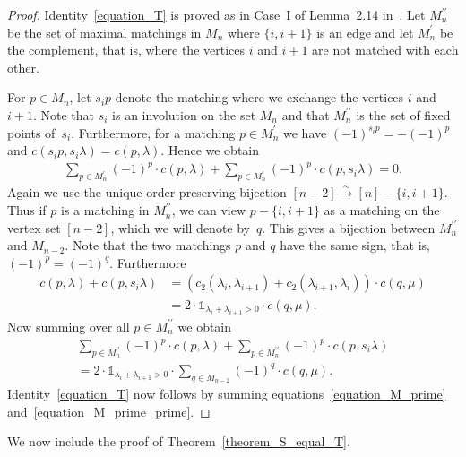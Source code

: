 \documentclass[ALCO,ThmDefs,Unicode,epreuves]{cedram}
\newcommand{\fl}{\rightarrow}
\newcommand{\ungras}{\mathds{1}}
\newcommand{\iso}{\stackrel{\sim}{\fl}}
\begin{document}
\begin{proof}
Identity~\eqref{equation_T} 
is proved as in Case~I of Lemma~2.14 in~\cite{Herb}.
Let $M_{n}^{\prime\prime}$ be the set
of maximal matchings in $M_{n}$ where
$\{i,i+1\}$ is an edge and
let $M_{n}^{\prime}$ be the complement,
that is, where the vertices $i$ and $i+1$ are not matched with each other.

For $p \in M_{n}$, let $s_{i}p$ denote the
matching where we exchange the vertices $i$ and~$i+1$.
Note that $s_{i}$ is an involution on the
set $M_{n}$
and that $M_{n}^{\prime\prime}$ is the set of fixed points
of~$s_{i}$.
Furthermore, for a matching $p \in M_{n}^{\prime}$
we have
$(-1)^{s_{i} p} = - (-1)^{p}$
and
$c(s_{i}p, s_{i} \lambda) = c(p, \lambda)$.
Hence we obtain
\begin{align}
\sum_{p \in M_{n}^{\prime}} (-1)^{p} \cdot c(p, \lambda)
+
\sum_{p \in M_{n}^{\prime}} (-1)^{p} \cdot c(p, s_{i} \lambda)
= 0 .
\label{equation_M_prime}
\end{align}
Again we use
the unique order-preserving bijection $[n-2] \iso [n] - \{i,i+1\}$.
Thus if $p$ is a matching in $M_{n}^{\prime\prime}$, we can view
$p-\{i,i+1\}$ as a matching
on the vertex set $[n-2]$, which we will denote by~$q$.
This gives a bijection between
$M_{n}^{\prime\prime}$
and $M_{n-2}$.
Note that the two matchings $p$ and $q$ have the same sign,
that is, $(-1)^{p} = (-1)^{q}$.
Furthermore
\begin{align*}
c(p,\lambda) + c(p,s_{i}\lambda) 
& =
(c_{2}(\lambda_{i},\lambda_{i+1}) + c_{2}(\lambda_{i+1},\lambda_{i}))
\cdot
c(q,\mu) \\
& =
2 \cdot \ungras_{\lambda_{i}+\lambda_{i+1} > 0}
\cdot
c(q,\mu) .
\end{align*}
Now summing over all $p \in M_{n}^{\prime\prime}$
we obtain
\begin{multline}
\label{equation_M_prime_prime}
\sum_{p \in M_{n}^{\prime\prime}}
(-1)^{p} \cdot c(p, \lambda)
+
\sum_{p \in M_{n}^{\prime\prime}}
(-1)^{p} \cdot c(p, s_{i} \lambda)
\\ = 
2 \cdot \ungras_{\lambda_{i}+\lambda_{i+1} > 0} 
\cdot
\sum_{q \in M_{n-2}} (-1)^{q} \cdot c(q, \mu) .
\end{multline}
Identity~\eqref{equation_T} 
now follows by summing equations~\eqref{equation_M_prime}
and~\eqref{equation_M_prime_prime}.
\end{proof}


We now include the proof of Theorem~\ref{theorem_S_equal_T}. 
\end{document}
